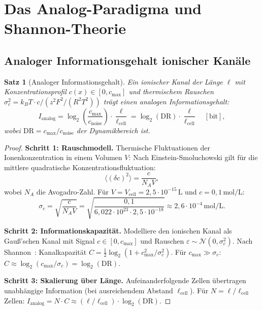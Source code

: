 ﻿\documentclass[a4paper,12pt]{article}
\theoremstyle{plain}
\newtheorem{satz}{Satz}
\theoremstyle{definition}
\theoremstyle{remark}
\begin{document}
\section{Das Analog-Paradigma und Shannon-Theorie}

\subsection{Analoger Informationsgehalt ionischer Kan\"ale}

\begin{satz}[Analoger Informationsgehalt]
\label{satz:analog_info}
Ein ionischer Kanal der L\"ange $\ell$ mit Konzentrationsprofil
$c(x) \in [0, c_{\max}]$ und thermischem Rauschen
$\sigma_c^2 = k_B T \cdot c / (z^2 F^2 / (R^2 T^2))$ tr\"agt
einen analogen Informationsgehalt:
\[
I_{\mathrm{analog}} = \log_2\!\left(\frac{c_{\max}}{c_{\mathrm{noise}}}\right) \cdot \frac{\ell}{\ell_{\mathrm{cell}}}
= \log_2(\mathrm{DR}) \cdot \frac{\ell}{\ell_{\mathrm{cell}}} \quad [\mathrm{bit}],
\]
wobei $\mathrm{DR} = c_{\max}/c_{\mathrm{noise}}$ der \emph{Dynamikbereich} ist.
\end{satz}

\begin{proof}
\textbf{Schritt 1: Rauschmodell.}
Thermische Fluktuationen der Ionenkonzentration in einem Volumen $V$:
Nach Einstein-Smoluchowski gilt f\"ur die mittlere quadratische Konzentrationsfluktuation:
\[
\langle (\delta c)^2 \rangle = \frac{c}{N_A V},
\]
wobei $N_A$ die Avogadro-Zahl.
F\"ur $V = V_{\mathrm{cell}} = 2{,}5 \cdot 10^{-15}\,\text{L}$ und
$c = 0{,}1\,\text{mol/L}$:
\[
\sigma_c = \sqrt{\frac{c}{N_A V}} = \sqrt{\frac{0{,}1}{6{,}022 \cdot 10^{23} \cdot 2{,}5 \cdot 10^{-18}}}
\approx 2{,}6 \cdot 10^{-4}\,\text{mol/L}.
\]

\textbf{Schritt 2: Informationskapazit\"at.}
Modelliere den ionischen Kanal als Gauß'schen Kanal mit Signal $c \in [0, c_{\max}]$
und Rauschen $\varepsilon \sim \mathcal{N}(0, \sigma_c^2)$.
Nach Shannon~\cite{shannon1948}: Kanalkapazit\"at
$C = \frac{1}{2}\log_2(1 + c_{\max}^2/\sigma_c^2)$.
F\"ur $c_{\max} \gg \sigma_c$: $C \approx \log_2(c_{\max}/\sigma_c) = \log_2(\mathrm{DR})$.

\textbf{Schritt 3: Skalierung \"uber L\"ange.}
Aufeinanderfolgende Zellen \"ubertragen unabh\"angige Information
(bei ausreichendem Abstand $\ell_{\mathrm{cell}}$).
F\"ur $N = \ell/\ell_{\mathrm{cell}}$ Zellen:
$I_{\mathrm{analog}} = N \cdot C \approx (\ell/\ell_{\mathrm{cell}}) \cdot \log_2(\mathrm{DR})$.
\end{proof}
\end{document}
